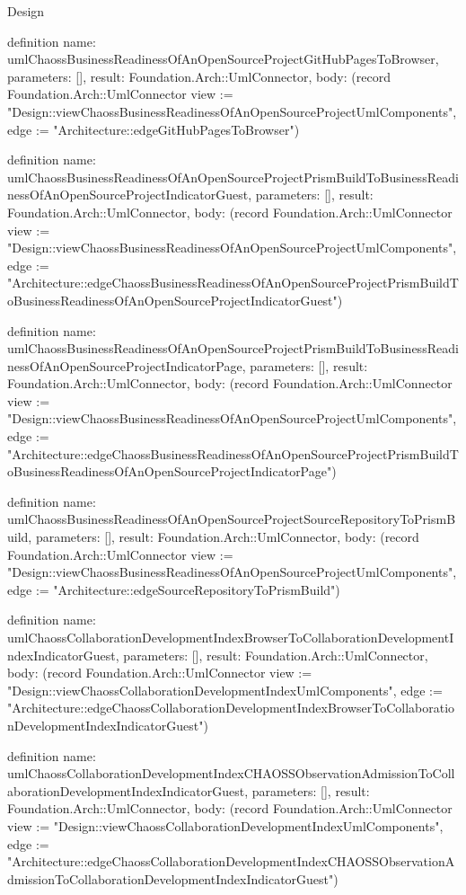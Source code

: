 \begin{lexlean}{Design}
\begin{semanticmodule}
definition{
  name: umlChaossBusinessReadinessOfAnOpenSourceProjectGitHubPagesToBrowser,
  parameters: [],
  result: Foundation.Arch::UmlConnector,
  body: (record Foundation.Arch::UmlConnector {view := "Design::viewChaossBusinessReadinessOfAnOpenSourceProjectUmlComponents", edge := "Architecture::edgeGitHubPagesToBrowser"})
}

definition{
  name: umlChaossBusinessReadinessOfAnOpenSourceProjectPrismBuildToBusinessReadinessOfAnOpenSourceProjectIndicatorGuest,
  parameters: [],
  result: Foundation.Arch::UmlConnector,
  body: (record Foundation.Arch::UmlConnector {view := "Design::viewChaossBusinessReadinessOfAnOpenSourceProjectUmlComponents", edge := "Architecture::edgeChaossBusinessReadinessOfAnOpenSourceProjectPrismBuildToBusinessReadinessOfAnOpenSourceProjectIndicatorGuest"})
}

definition{
  name: umlChaossBusinessReadinessOfAnOpenSourceProjectPrismBuildToBusinessReadinessOfAnOpenSourceProjectIndicatorPage,
  parameters: [],
  result: Foundation.Arch::UmlConnector,
  body: (record Foundation.Arch::UmlConnector {view := "Design::viewChaossBusinessReadinessOfAnOpenSourceProjectUmlComponents", edge := "Architecture::edgeChaossBusinessReadinessOfAnOpenSourceProjectPrismBuildToBusinessReadinessOfAnOpenSourceProjectIndicatorPage"})
}

definition{
  name: umlChaossBusinessReadinessOfAnOpenSourceProjectSourceRepositoryToPrismBuild,
  parameters: [],
  result: Foundation.Arch::UmlConnector,
  body: (record Foundation.Arch::UmlConnector {view := "Design::viewChaossBusinessReadinessOfAnOpenSourceProjectUmlComponents", edge := "Architecture::edgeSourceRepositoryToPrismBuild"})
}

definition{
  name: umlChaossCollaborationDevelopmentIndexBrowserToCollaborationDevelopmentIndexIndicatorGuest,
  parameters: [],
  result: Foundation.Arch::UmlConnector,
  body: (record Foundation.Arch::UmlConnector {view := "Design::viewChaossCollaborationDevelopmentIndexUmlComponents", edge := "Architecture::edgeChaossCollaborationDevelopmentIndexBrowserToCollaborationDevelopmentIndexIndicatorGuest"})
}

definition{
  name: umlChaossCollaborationDevelopmentIndexCHAOSSObservationAdmissionToCollaborationDevelopmentIndexIndicatorGuest,
  parameters: [],
  result: Foundation.Arch::UmlConnector,
  body: (record Foundation.Arch::UmlConnector {view := "Design::viewChaossCollaborationDevelopmentIndexUmlComponents", edge := "Architecture::edgeChaossCollaborationDevelopmentIndexCHAOSSObservationAdmissionToCollaborationDevelopmentIndexIndicatorGuest"})
}


\end{semanticmodule}
\end{lexlean}
